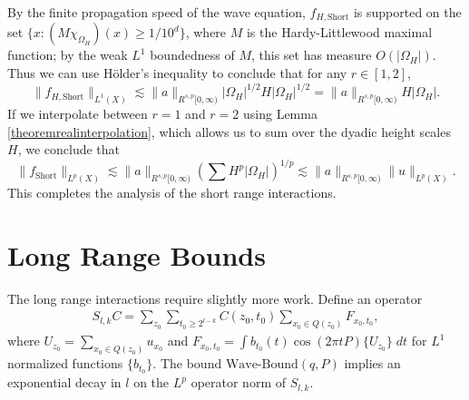 %
By the finite propagation speed of the wave equation, $f_{H,\text{Short}}$ is supported on the set $\{ x: (M \chi_{\Omega_H})(x) \geq 1/10^d \}$, where $M$ is the Hardy-Littlewood maximal function; by the weak $L^1$ boundedness of $M$, this set has measure $O(|\Omega_H|)$. Thus we can use H\"{o}lder's inequality to conclude that for any $r \in [1,2]$,
%
\begin{equation}
    \| f_{H,\text{Short}} \|_{L^1(X)} \lesssim \| a \|_{R^{s,p}[0,\infty)} |\Omega_H|^{1/2} H |\Omega_H|^{1/2} = \| a \|_{R^{s,p}[0,\infty)} H |\Omega_H|.
\end{equation}
%
If we interpolate between $r = 1$ and $r = 2$ using Lemma \ref{theoremrealinterpolation}, which allows us to sum over the dyadic height scales $H$, we conclude that
%
\begin{equation}
    \| f_{\text{Short}} \|_{L^p(X)} \lesssim  \| a \|_{R^{s,p}[0,\infty)} \left( \sum H^p |\Omega_H| \right)^{1/p} \lesssim \| a \|_{R^{s,p}[0,\infty)} \| u \|_{L^p(X)}.
\end{equation}
%
This completes the analysis of the short range interactions.

\section{Long Range Bounds}

The long range interactions require slightly more work. Define an operator
%
\begin{equation}
\begin{split}
    S_{l,k} C = \sum\nolimits_{z_0} \sum\nolimits_{t_0 \geq 2^{l-k}} C(z_0,t_0) \sum\nolimits_{x_0 \in Q(z_0)} F_{x_0,t_0},
\end{split}
\end{equation}
%
where $U_{z_0} = \sum_{x_0 \in Q(z_0)} u_{x_0}$ and $F_{x_0,t_0} = \int b_{t_0}(t) \cos(2 \pi t P) \{ U_{z_0} \}\; dt$ for $L^1$ normalized functions $\{ b_{t_0} \}$. The bound $\text{Wave-Bound}(q,P)$ implies an exponential decay in $l$ on the $L^p$ operator norm of $S_{l,k}$.

